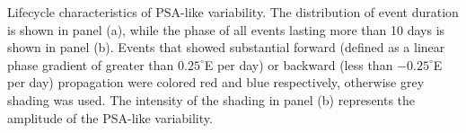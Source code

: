 \label{fig:lifecycle}
Lifecycle characteristics of PSA-like variability. The distribution of event duration is shown in panel (a), while the phase of all events lasting more than 10 days is shown in panel (b). Events that showed substantial forward (defined as a linear phase gradient of greater than $0.25^{\circ}$E per day) or backward (less than $-0.25^{\circ}$E per day) propagation were colored red and blue respectively, otherwise grey shading was used. The intensity of the shading in panel (b) represents the amplitude of the PSA-like variability.
